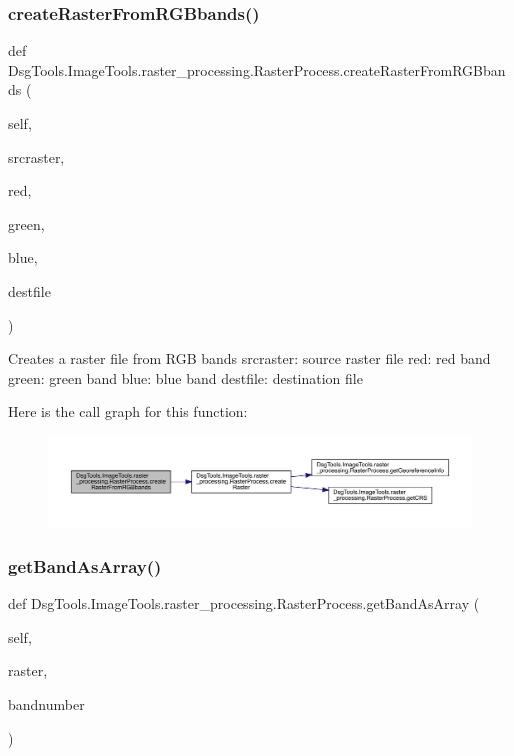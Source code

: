 \subsubsection{\texorpdfstring{create\+Raster\+From\+R\+G\+Bbands()}{createRasterFromRGBbands()}}
{\footnotesize\ttfamily def Dsg\+Tools.\+Image\+Tools.\+raster\+\_\+processing.\+Raster\+Process.\+create\+Raster\+From\+R\+G\+Bbands (\begin{DoxyParamCaption}\item[{}]{self,  }\item[{}]{srcraster,  }\item[{}]{red,  }\item[{}]{green,  }\item[{}]{blue,  }\item[{}]{destfile }\end{DoxyParamCaption})}

\begin{DoxyVerb}Creates a raster file from RGB bands
srcraster: source raster file
red: red band
green: green band
blue: blue band
destfile: destination file
\end{DoxyVerb}
 Here is the call graph for this function\+:
\nopagebreak
\begin{figure}[H]
\begin{center}
\leavevmode
\includegraphics[width=350pt]{class_dsg_tools_1_1_image_tools_1_1raster__processing_1_1_raster_process_af334cdc5aa7d11ee74e1cc97b3007abf_cgraph}
\end{center}
\end{figure}
\mbox{\label{class_dsg_tools_1_1_image_tools_1_1raster__processing_1_1_raster_process_a89410abdd251c750c0e13783e9bfbe23}} 
\subsubsection{\texorpdfstring{get\+Band\+As\+Array()}{getBandAsArray()}}
{\footnotesize\ttfamily def Dsg\+Tools.\+Image\+Tools.\+raster\+\_\+processing.\+Raster\+Process.\+get\+Band\+As\+Array (\begin{DoxyParamCaption}\item[{}]{self,  }\item[{}]{raster,  }\item[{}]{bandnumber }\end{DoxyParamCaption})}

